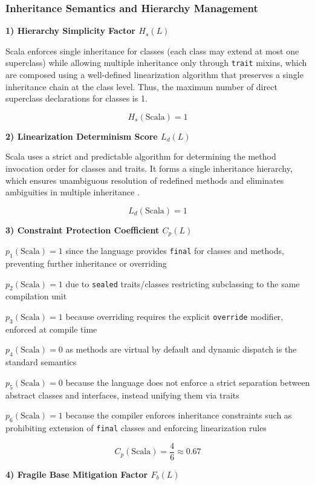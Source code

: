 \subsubsection{Inheritance Semantics and Hierarchy Management}

\textbf{1) Hierarchy Simplicity Factor $H_s(L)$}

Scala enforces single inheritance for classes (each class may extend at most one superclass) while allowing multiple inheritance only through \texttt{trait} mixins, which are composed using a well-defined linearization algorithm that preserves a single inheritance chain at the class level. Thus, the maximum number of direct superclass declarations for classes is 1.

\[
    H_s(\text{Scala}) = 1
\]


\textbf{2) Linearization Determinism Score $L_d(L)$}

Scala uses a strict and predictable algorithm for determining the method invocation order for classes and traits.
It forms a single inheritance hierarchy, which ensures unambiguous resolution of redefined methods and eliminates ambiguities in multiple inheritance \cite{odersky2004overview}.

\[
    L_d(\text{Scala}) = 1
\]

\textbf{3) Constraint Protection Coefficient $C_p(L)$}

$p_1(\text{Scala})=1$ since the language provides \texttt{final} for classes and methods, preventing further inheritance or overriding

$p_2(\text{Scala})=1$ due to \texttt{sealed} traits/classes restricting subclassing to the same compilation unit

$p_3(\text{Scala})=1$ because overriding requires the explicit \texttt{override} modifier, enforced at compile time

$p_4(\text{Scala})=0$ as methods are virtual by default and dynamic dispatch is the standard semantics

$p_5(\text{Scala})=0$ because the language does not enforce a strict separation between abstract classes and interfaces, instead unifying them via traits

$p_6(\text{Scala})=1$ because the compiler enforces inheritance constraints such as prohibiting extension of \texttt{final} classes and enforcing linearization rules

\[
    C_p(\text{Scala}) = \frac{4}{6} \approx 0.67
\]

\textbf{4) Fragile Base Mitigation Factor $F_b(L)$}

